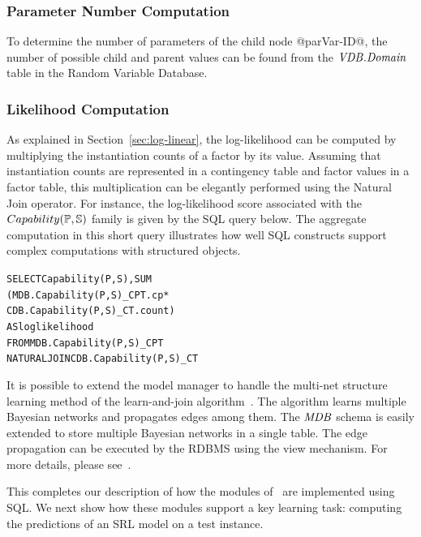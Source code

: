\documentclass{IEEEtran}
\begin{document}
\subsubsection{Parameter Number Computation} To determine the number of parameters of the child node @parVar-ID@, the number of possible child and parent values can be found from the $\it{\RVD.Domain}$ table in the Random Variable Database.  


\subsubsection{Likelihood Computation} As explained in Section~\ref{sec:log-linear}, the log-likelihood can be computed by multiplying the instantiation counts of a factor by its value. Assuming that instantiation counts are represented in a contingency table and factor values in a factor table, this multiplication can be elegantly performed using the Natural Join operator. For instance, the log-likelihood score associated with the $Capability(\P,\S)$ family is given by the SQL query below. The aggregate computation in this short query illustrates how well SQL constructs support complex computations with structured objects. 

\begin{alltt}
SELECT Capability(P,S),  SUM
(MDB.Capability(P,S)\_CPT.cp * \\CDB.Capability(P,S)\_CT.count) 
AS loglikelihood
FROM MDB.Capability(P,S)\_CPT 
NATURAL JOIN CDB.Capability(P,S)\_CT
\end{alltt}




It is possible to extend the model manager to handle the multi-net structure learning method of the learn-and-join algorithm~\cite{Schulte2012}. The algorithm learns multiple Bayesian networks and propagates edges among them. The $\MDB$ schema is easily extended to store multiple Bayesian networks in a single table. The edge propagation can be executed by the RDBMS using the view mechanism. For more details, please see~\cite{bib:bbsite}. 

This completes our description of how the modules of \FB\ are implemented using SQL. We next show how these modules support a key learning task: computing the predictions of an SRL model on a test instance. 
\end{document}
